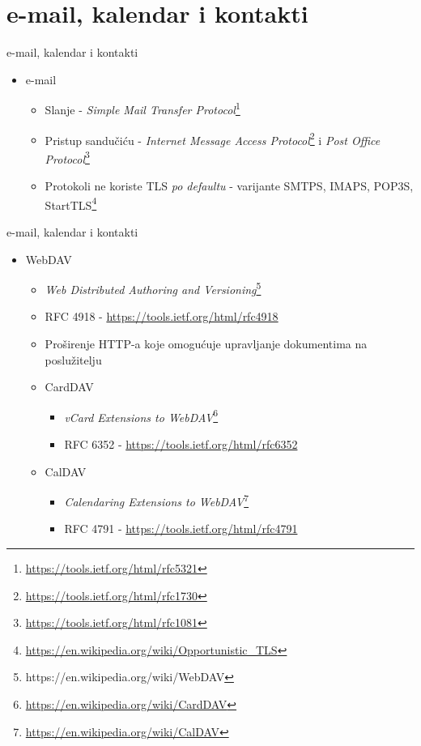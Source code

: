 \documentclass[t]{beamer}
\begin{document}
\section{e-mail, kalendar i kontakti}

\begin{frame}{e-mail, kalendar i kontakti}
    \begin{itemize}
        \item e-mail
        \begin{itemize}
            \item Slanje - \textit{Simple Mail Transfer Protocol}\footnote{\url{https://tools.ietf.org/html/rfc5321}}
            \item Pristup sandučiću - \textit{Internet Message Access Protocol}\footnote{\url{https://tools.ietf.org/html/rfc1730}} i \textit{Post Office Protocol}\footnote{\url{https://tools.ietf.org/html/rfc1081}}
            \item Protokoli ne koriste TLS \textit{po defaultu} - varijante SMTPS, IMAPS, POP3S, StartTLS\footnote{\url{https://en.wikipedia.org/wiki/Opportunistic_TLS}}
        \end{itemize}
    \end{itemize}
\end{frame}

\begin{frame}{e-mail, kalendar i kontakti}
    \begin{itemize}
        \item WebDAV
        \begin{itemize}
            \item \textit{Web Distributed Authoring and Versioning}\footnote{https://en.wikipedia.org/wiki/WebDAV}
            \item RFC 4918 - \url{https://tools.ietf.org/html/rfc4918}
            \item Proširenje HTTP-a koje omogućuje upravljanje dokumentima na poslužitelju
            \item CardDAV
            \begin{itemize}
                \item \textit{vCard Extensions to WebDAV}\footnote{\url{https://en.wikipedia.org/wiki/CardDAV}}
                \item RFC 6352 - \url{https://tools.ietf.org/html/rfc6352}
            \end{itemize}
            \item CalDAV
            \begin{itemize}
                \item \textit{Calendaring Extensions to WebDAV}\footnote{\url{https://en.wikipedia.org/wiki/CalDAV}}
                \item RFC 4791 - \url{https://tools.ietf.org/html/rfc4791}
            \end{itemize}
        \end{itemize}
    \end{itemize}
\end{frame}
\end{document}
